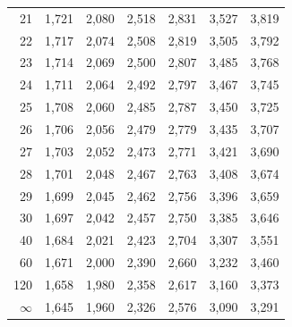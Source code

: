 \documentclass[a4paper,10pt]{extarticle}
\begin{document}
\begin{minipage}[t]{0.47\textwidth}
\begin{tabular}{r|rrrrrr}
21 & 1,721 & 2,080 & 2,518 & 2,831 & 3,527 & 3,819\\
22 & 1,717 & 2,074 & 2,508 & 2,819 & 3,505 & 3,792\\
23 & 1,714 & 2,069 & 2,500 & 2,807 & 3,485 & 3,768\\
24 & 1,711 & 2,064 & 2,492 & 2,797 & 3,467 & 3,745\\
25 & 1,708 & 2,060 & 2,485 & 2,787 & 3,450 & 3,725\\
26 & 1,706 & 2,056 & 2,479 & 2,779 & 3,435 & 3,707\\
27 & 1,703 & 2,052 & 2,473 & 2,771 & 3,421 & 3,690\\
28 & 1,701 & 2,048 & 2,467 & 2,763 & 3,408 & 3,674\\
29 & 1,699 & 2,045 & 2,462 & 2,756 & 3,396 & 3,659\\
30 & 1,697 & 2,042 & 2,457 & 2,750 & 3,385 & 3,646\\
40 & 1,684 & 2,021 & 2,423 & 2,704 & 3,307 & 3,551\\
60 & 1,671 & 2,000 & 2,390 & 2,660 & 3,232 & 3,460\\
120 & 1,658 & 1,980 & 2,358 & 2,617 & 3,160 & 3,373\\
$\infty$ & 1,645 & 1,960 & 2,326 & 2,576 & 3,090 & 3,291\\
\end{tabular}
\end{minipage}\hfill
\end{document}
